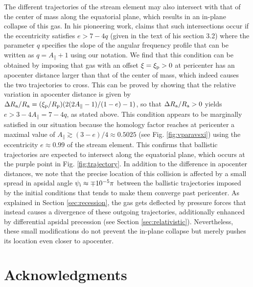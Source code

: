 \documentclass[a4paper,fleqn,usenatbib]{mnras}
\newcommand{\rp}{R_{\rm p}}
\begin{document}
The different trajectories of the stream element may also intersect with that of the center of mass along the equatorial plane, which results in an in-plane collapse of this gas. In his pioneering work, \citet{kochanek1994} claims that such intersections occur if the eccentricity satisfies $e> 7-4q$ (given in the text of his section 3.2) where the parameter $q$ specifies the slope of the angular frequency profile that can be written as $q = A_{\parallel} +1$ using our notation. We find that this condition can be obtained by imposing that gas with an offset $\xi = \xi_{\rm p} > 0$ at pericenter has an apocenter distance larger than that of the center of mass, which indeed causes the two trajectories to cross. This can be proved by showing that the relative variation in apocenter distance is given by $\Delta R_{\rm a}/R_{\rm a} = (\xi_{\rm p} / \rp) (2 (2 A_{\parallel} -1 )/(1-e)-1)$, so that $\Delta R_{\rm a}/R_{\rm a} > 0$ yields $e>3-4A_{\parallel} = 7-4q$, as stated above. This condition appears to be marginally satisfied in our situation because the homology factor reaches at pericenter a maximal value of $A_{\parallel} \gtrsim (3 -e)/4 \approx 0.5025$ (see Fig. \ref{fig:vparavsxi}) using the eccentricity $e \approx 0.99$ of the stream element. This confirms that ballistic trajectories are expected to intersect along the equatorial plane, which occurs at the purple point in Fig. \ref{fig:trajectory}. In addition to the difference in apocenter distances, we note that the precise location of this collision is affected by a small spread in apsidal angle $\psi_{\rm i} \approx \mp 10^{-5} \pi$ between the ballistic trajectories imposed by the initial conditions that tends to make them converge past pericenter. As explained in Section \ref{sec:recession}, the gas gets deflected by pressure forces that instead causes a divergence of these outgoing trajectories, additionally enhanced by differential apsidal precession (see Section \ref{sec:relativistic}). Nevertheless, these small modifications do not prevent the in-plane collapse but merely pushes its location even closer to apocenter. 
 
 







\section*{Acknowledgments}
\end{document}
